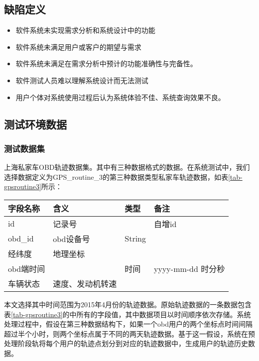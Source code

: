 \subsection{缺陷定义}
\label{subsec:software flaw definition}
\begin{itemize}
	\item 软件系统未实现需求分析和系统设计中的功能
	\item 软件系统未满足用户或客户的期望与需求
	\item 软件系统未满足在需求分析中预计的功能准确性与完备性。
	\item 软件测试人员难以理解系统设计而无法测试
	\item 用户个体对系统使用过程后认为系统体验不佳、系统查询效果不良。
\end{itemize}

\subsection{测试环境数据}
\label{subsec:environment}

\subsubsection{测试数据集}
\label{subsubsec:dataset}
上海私家车OBD轨迹数据集\cite{NRL}。其中有三种数据格式的数据。在系统测试中，我们选择数据定义为GPS\_routine\_3的第三种数据类型私家车轨迹数据，如表\ref{tab-gpsroutine3}所示：
	\begin{table}[!htpb]
  	\centering
		\begin{tabular}{ |p{2cm}|p{3.5cm}|p{2cm}|p{4.5cm}| }
		\hline
		字段名称 & 含义 & 类型 & 备注\\
		\hline
		id & 记录号 & & 自增id \\
		\hline
		obd\_id & obd设备号 & String & \\
		\hline
		经纬度 & 地理坐标 &  & \\
		\hline
		obd端时间 & & 时间 & yyyy-mm-dd 时分秒\\
		\hline
		车辆状态 & 速度、发动机转速 & & \\
		\hline 
		\end{tabular}
	\end{table}
	
	本文选择其中时间范围为2015年4月份的轨迹数据。原始轨迹数据的一条数据包含表\ref{tab-gpsroutine3}的中所有的字段值，其中数据项目以时间顺序依次存储。系统处理过程中，假设在第三种数据结构下，如果一个obd用户的两个坐标点时间间隔超过半个小时，则两个坐标点属于不同的两天轨迹数据。基于这一假设，系统在预处理阶段轨将每个用户的轨迹点划分到对应的轨迹数据中，生成用户的轨迹历史数据。
	
